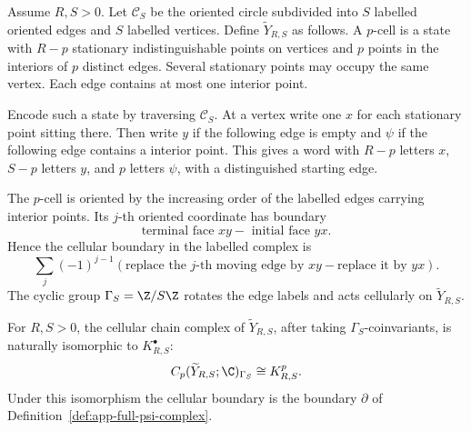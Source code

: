 \begin{constr}
\label{constr:app-cyclic-word-cell-complex}
  Assume \(R,S>0\).  Let \(\mathscr C_S\) be the oriented circle subdivided
  into \(S\) labelled oriented edges and \(S\) labelled vertices.  Define
  \(\widetilde Y_{R,S}\) as follows.  A \(p\)-cell is a state with
  \(R-p\) stationary indistinguishable points on vertices and \(p\) points
  in the interiors of \(p\) distinct edges.  Several stationary points
  may occupy the same vertex.  Each edge contains at most one interior point.

  Encode such a state by traversing \(\mathscr C_S\).  At a vertex write one
  \(x\) for each stationary point sitting there.  Then write \(y\) if the
  following edge is empty and \(\psi\) if the following edge contains a
  interior point.  This gives a word with \(R-p\) letters \(x\), \(S-p\) letters
  \(y\), and \(p\) letters \(\psi\), with a distinguished starting edge.

  The \(p\)-cell is oriented by the increasing order of the labelled edges
  carrying interior points.  Its \(j\)-th oriented coordinate has boundary
  \[
    \text{terminal face }xy-\text{ initial face }yx.
  \]
  Hence the cellular boundary in the labelled complex is
  \[
    \sum_j(-1)^{j-1}(\text{replace the \(j\)-th moving edge by \(xy\)}
      -\text{replace it by \(yx\)}).
  \]
  The cyclic group \(\Gamma_S=\Z/S\Z\) rotates the edge labels and acts
  cellularly on \(\widetilde Y_{R,S}\).
\end{constr}

\begin{lem}
\label{lem:app-state-chain-identification}
  For \(R,S>0\), the cellular chain complex of
  \(\widetilde Y_{R,S}\), after taking \(\Gamma_S\)-coinvariants, is naturally
  isomorphic to \(K^\bullet_{R,S}\):
  \[
    C_p(\widetilde Y_{R,S};\C)_{\Gamma_S}\cong K^p_{R,S}.
  \]
  Under this isomorphism the cellular boundary is the boundary
  \(\partial\) of Definition~\ref{def:app-full-psi-complex}.
\end{lem}

